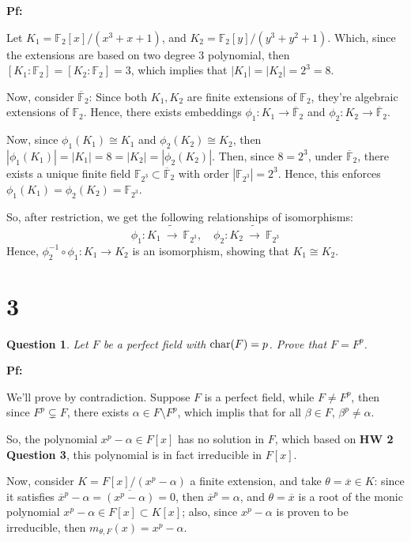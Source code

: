 \documentclass{article}
\newtheorem{question}{Question}
\begin{document}
\textbf{Pf:}

Let $K_1=\mathbb{F}_2[x]/(x^3+x+1)$, and $K_2=\mathbb{F}_2[y]/(y^3+y^2+1)$. Which, since the extensions are based on two degree $3$ polynomial, then $[K_1:\mathbb{F}_2]=[K_2:\mathbb{F}_2]=3$, which implies that $|K_1| = |K_2| = 2^3=8$.

Now, consider $\overline{\mathbb{F}}_2$: Since both $K_1,K_2$ are finite extensions of $\mathbb{F}_2$, they're algebraic extensions of $\mathbb{F}_2$. Hence, there exists embeddings $\phi_1:K_1\rightarrow \overline{\mathbb{F}}_2$ and $\phi_2:K_2\rightarrow\overline{\mathbb{F}}_2$.

Now, since $\phi_1(K_1)\cong K_1$ and $\phi_2(K_2)\cong K_2$, then $|\phi_1(K_1)|=|K_1|=8=|K_2|=|\phi_2(K_2)|$. Then, since $8=2^3$, under $\overline{\mathbb{F}}_2$, there exists a unique finite field $\mathbb{F}_{2^3}\subset\overline{\mathbb{F}}_2$ with order $|\mathbb{F}_{2^3}|=2^3$. Hence, this enforces $\phi_1(K_1)=\phi_2(K_2)=\mathbb{F}_{2^3}$.

So, after restriction, we get the following relationships of isomorphisms:
$$\phi_1:K_1\ \tilde{\rightarrow}\ \mathbb{F}_{2^3},\quad \phi_2:K_2\ \tilde{\rightarrow}\ \mathbb{F}_{2^3}$$
Hence, $\phi_2^{-1}\circ \phi_1:K_1\rightarrow K_2$ is an isomorphism, showing that $K_1\cong K_2$.

\hfil



\break

\section*{3}
\begin{myBox}[]{}
    \begin{question}
        Let $F$ be a perfect field with $\textmd{char}(F)=p$. Prove that $F=F^p$.
    \end{question}
\end{myBox}

\textbf{Pf:}

We'll prove by contradiction. Suppose $F$ is a perfect field, while $F\neq F^p$, then since $F^p\subsetneq F$, there exists $\alpha\in F\setminus F^p$, which implis that for all $\beta\in F$, $\beta^p\neq \alpha$.

So, the polynomial $x^p-\alpha \in F[x]$ has no solution in $F$, which based on \textbf{HW 2 Question 3}, this polynomial is in fact irreducible in $F[x]$.

\hfil

Now, consider $K=F[x]/(x^p-\alpha)$ a finite extension, and take $\theta=\overline{x}\in K$: since it satisfies $\overline{x}^p-\alpha = \overline{(x^p-\alpha)}=0$, then $\overline{x}^p=\alpha$, and $\theta = \overline{x}$ is a root of the monic polynomial $x^p-\alpha\in F[x]\subset K[x]$; also, since $x^p-\alpha$ is proven to be irreducible, then $m_{\theta,F}(x)=x^p-\alpha$.
\end{document}
